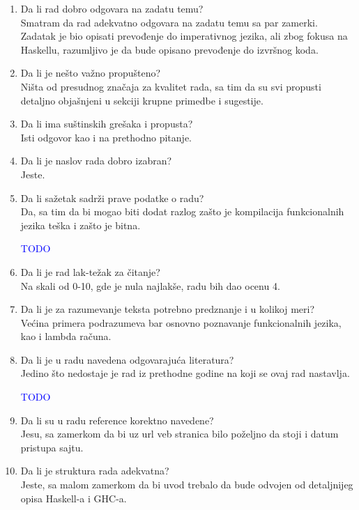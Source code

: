 \documentclass[a4paper]{report}
\newcommand{\odgovor}[1]{\textcolor{blue}{#1}}
\begin{document}
\begin{enumerate}
\item Da li rad dobro odgovara na zadatu temu?\\
	Smatram da rad adekvatno odgovara na zadatu temu sa par zamerki. Zadatak je bio opisati prevođenje do imperativnog jezika, ali zbog fokusa na Haskellu, razumljivo je da bude opisano prevođenje do izvršnog koda.
	
\item Da li je nešto važno propušteno?\\
	Ništa od presudnog značaja za kvalitet rada, sa tim da su svi propusti detaljno objašnjeni u sekciji krupne primedbe i sugestije.
	
\item Da li ima suštinskih grešaka i propusta?\\
	Isti odgovor kao i na prethodno pitanje.
	
\item Da li je naslov rada dobro izabran?\\
	Jeste.
	
\item Da li sažetak sadrži prave podatke o radu?\\
	Da, sa tim da bi mogao biti dodat razlog zašto je kompilacija funkcionalnih jezika teška i zašto je bitna.
	
	\odgovor{TODO}
	
\item Da li je rad lak-težak za čitanje?\\
	Na skali od 0-10, gde je nula najlakše, radu bih dao ocenu 4.

\item Da li je za razumevanje teksta potrebno predznanje i u kolikoj meri?\\
	Većina primera podrazumeva bar osnovno poznavanje funkcionalnih jezika, kao i lambda računa.

\item Da li je u radu navedena odgovarajuća literatura?\\
	Jedino što nedostaje je rad iz prethodne godine na koji se ovaj rad nastavlja.
	
	\odgovor{TODO}
	
\item Da li su u radu reference korektno navedene?\\
	Jesu, sa zamerkom da bi uz url veb stranica bilo poželjno da stoji i datum pristupa sajtu.
	
\item Da li je struktura rada adekvatna?\\
	Jeste, sa malom zamerkom da bi uvod trebalo da bude odvojen od detaljnijeg opisa Haskell-a i GHC-a.
	

\end{enumerate}
\end{document}
